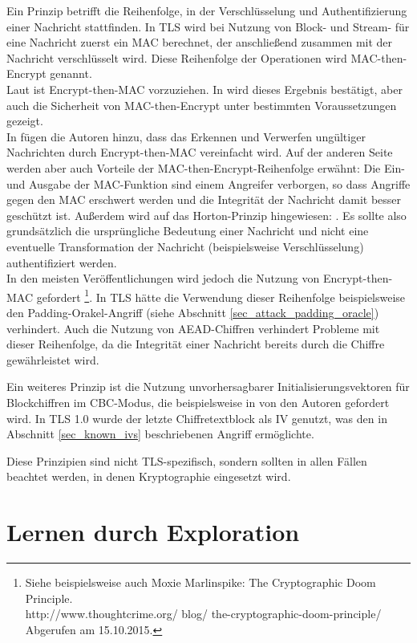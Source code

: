 Ein Prinzip betrifft die Reihenfolge, in der Verschlüsselung und Authentifizierung einer Nachricht stattfinden. 
In TLS wird bei Nutzung von Block- und Stream-\ciphersuites{} für eine Nachricht zuerst ein MAC berechnet, der anschließend zusammen mit der Nachricht verschlüsselt wird. Diese Reihenfolge der Operationen wird MAC-then-Encrypt genannt. \\
Laut \cite{AE2000} ist Encrypt-then-MAC vorzuziehen. In \cite{krawczyk01} wird dieses Ergebnis bestätigt, aber auch die Sicherheit von MAC-then-Encrypt unter bestimmten Voraussetzungen gezeigt.\\
In \cite{ferguson10} fügen die Autoren hinzu, dass das Erkennen und Verwerfen ungültiger Nachrichten durch Encrypt-then-MAC vereinfacht wird. Auf der anderen Seite werden aber auch Vorteile der MAC-then-Encrypt-Reihenfolge erwähnt: Die Ein- und Ausgabe der MAC-Funktion sind einem Angreifer verborgen, so dass Angriffe gegen den MAC erschwert werden und die Integrität der Nachricht damit besser geschützt ist. Außerdem wird auf das Horton-Prinzip hingewiesen:  \cite{wagner96}. Es sollte also grundsätzlich die ursprüngliche Bedeutung einer Nachricht und nicht eine eventuelle Transformation der Nachricht (beispielsweise Verschlüsselung) authentifiziert werden.\\
In den meisten Veröffentlichungen wird jedoch die Nutzung von Encrypt-then-MAC gefordert \footnote{
	Siehe beispielsweise auch Moxie Marlinspike: The Cryptographic Doom Principle. \\
	http://www.thoughtcrime.org/ blog/ the-cryptographic-doom-principle/ Abgerufen am 15.10.2015.
}. In TLS hätte die Verwendung dieser Reihenfolge beispielsweise den Padding-Orakel-Angriff (siehe Abschnitt \ref{sec_attack_padding_oracle}) verhindert. Auch die Nutzung von AEAD-Chiffren verhindert Probleme mit dieser Reihenfolge, da die Integrität einer Nachricht bereits durch die Chiffre gewährleistet wird.

Ein weiteres Prinzip ist die Nutzung unvorhersagbarer Initialisierungsvektoren für Blockchiffren im CBC-Modus, die beispielsweise in \cite{ferguson10} von den Autoren gefordert wird. In TLS 1.0 wurde der letzte Chiffretextblock als IV genutzt, was den in Abschnitt \ref{sec_known_ivs} beschriebenen Angriff ermöglichte.

Diese Prinzipien sind nicht TLS-spezifisch, sondern sollten in allen Fällen beachtet werden, in denen Kryptographie eingesetzt wird.

\section{Lernen durch Exploration}
\label{sec_exploration}

